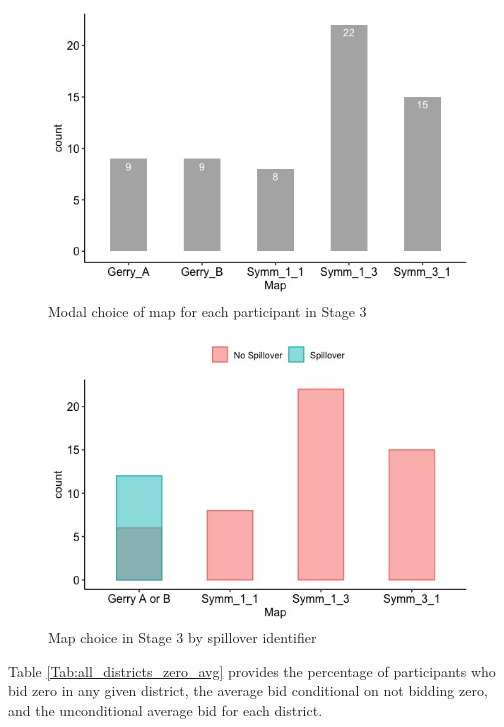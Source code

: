 \documentclass[AER]{AEA}
\begin{document}
\begin{figure}[!h]
\centering
\includegraphics[scale=0.5]{map_choice_stage_3.jpeg}
\caption{Modal choice of map for each participant in Stage 3}
\label{fig:map_choice_stage_3}
\end{figure}
\begin{figure}[!h]
\centering
\includegraphics[scale=0.5]{spillover_unadjusted.jpeg}
\caption{Map choice in Stage 3 by spillover identifier}
\label{fig:spillover_unadjusted}
\end{figure}

\newpage

Table \ref{Tab:all_districts_zero_avg} provides the percentage of participants who bid zero in any given district, the average bid conditional on not bidding zero, and the unconditional average bid for each district.
\end{document}
